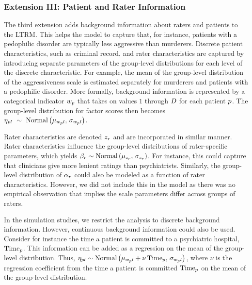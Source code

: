 \documentclass[a4paper,usenames,dvipsnames]{article}
\newenvironment{revisionN}{\color{black}}{\color{black}}
\begin{document}
\subsubsection*{Extension III: Patient and Rater Information}
The third extension adds background information about raters and patients to the LTRM. This helps the model to capture that, for instance, patients with a pedophilic disorder are typically less aggressive than murderers. Discrete patient characteristics, such as criminal record,  and rater characteristics are captured by introducing separate parameters of the group-level distributions for each level of the discrete characteristic. For example, the mean of the group-level distribution of the aggressiveness scale is estimated separately for murderers and patients with a pedophilic disorder. More formally, background information is represented by a categorical indicator $w_{p}$ that takes on values $1$ through $\TdiscreteP$ for each patient $p$. The group-level distribution for factor scores then becomes $\eta_{pl}~\sim~\text{Normal}\left(\mu_{w_pl},\,\sigma_{w_pl}\right)$.

Rater characteristics are denoted $z_r$ and are incorporated in similar manner. Rater characteristics influence the group-level distributions of rater-specific parameters, which yields $\beta_r \sim \text{Normal}\left(\mu_{z_r},\,\sigma_{z_r}\right)$. For instance, this could capture that clinicians give more lenient ratings than psychiatrists.
\begin{revisionN}%
Similarly, the group-level distribution of $\alpha_r$ could also be modeled as a function of rater characteristics. However, we did not include this in the model as there was no empirical observation that implies the scale parameters differ across groups of raters.
\end{revisionN}

In the simulation studies, we restrict the analysis to discrete background information. However, continuous background information could also be used. Consider for instance the time a patient is committed to a psychiatric hospital, $\mathrm{Time}_p$.  This information can be added as a regression on the mean of the group-level distribution. Thus, $\eta_{pl} \sim \text{Normal}\left(\mu_{w_pl} + \nu\,\mathrm{Time}_p,\,\sigma_{w_pl}\right)$, where $\nu$ is the regression coefficient from the time a patient is committed $\mathrm{Time}_p$ on the mean of the group-level distribution.
\end{document}
